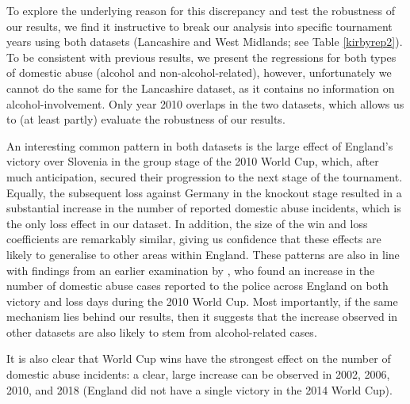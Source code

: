 \documentclass[12pt, a4paper]{article}
\begin{document}
To explore the underlying reason for this discrepancy and test the robustness of our results, we find it instructive to break our analysis into specific tournament years using both datasets (Lancashire and West Midlands; see Table \ref{kirbyrep2}). To be consistent with previous results, we present the regressions for both types of domestic abuse (alcohol and non-alcohol-related), however, unfortunately we cannot do the same for the Lancashire dataset, as it contains no information on alcohol-involvement. Only year 2010 overlaps in the two datasets, which allows us to (at least partly) evaluate the robustness of our results.

An interesting common pattern in both datasets is the large effect of England's victory over Slovenia in the group stage of the 2010 World Cup, which, after much anticipation, secured their progression to the next stage of the tournament. Equally, the subsequent loss against Germany in the knockout stage resulted in a substantial increase in the number of reported domestic abuse incidents, which is the only loss effect in our dataset. In addition, the size of the win and loss coefficients are remarkably similar, giving us confidence that these effects are likely to generalise to other areas within England. These patterns are also in line with findings from an earlier examination by \cite{Brimicombe2012}, who found an increase in the number of domestic abuse cases reported to the police across England on both victory and loss days during the 2010 World Cup.  Most importantly, if the same mechanism lies behind our results, then it suggests that the increase observed in other datasets are also likely to stem from alcohol-related cases. 
   
  It is also clear that World Cup wins have the strongest effect on the number of domestic abuse incidents: a clear, large increase can be observed in 2002, 2006, 2010, and 2018 (England did not have a single victory in the 2014 World Cup).
 

\end{document}
